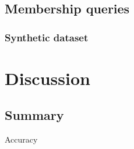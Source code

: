 \subsection{Membership queries}

\subsubsection*{Synthetic dataset}

\section{Discussion\label{section:evaluation-discussion}}

\vfill
\subsection{Summary}

\vspace{-0cm}
{\noindent\small\sc Accuracy}
\vspace{-0cm}

